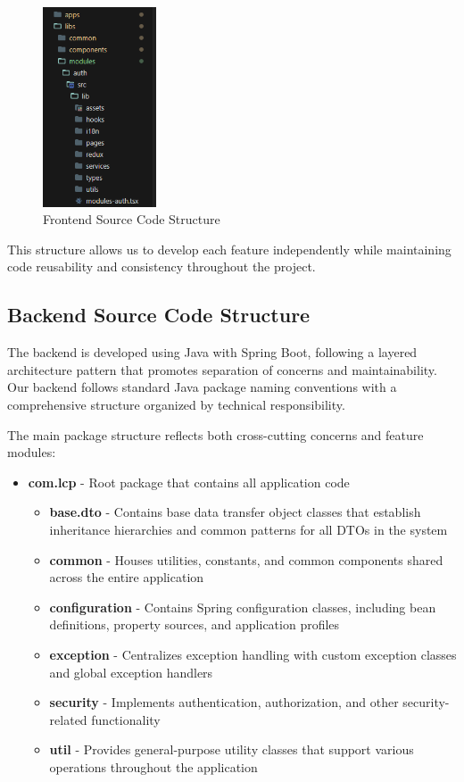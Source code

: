 \begin{figure}[H]
  \centering
  \includegraphics[width=0.3\textwidth]{graphics/sys-design/frontend_folder_structure_1.png}
  \caption{Frontend Source Code Structure}
  \label{fig:frontend_structure}
\end{figure} 


This structure allows us to develop each feature independently while maintaining code reusability and consistency throughout the project.

\subsection{Backend Source Code Structure}
The backend is developed using Java with Spring Boot, following a layered architecture pattern that promotes separation of concerns and maintainability. Our backend follows standard Java package naming conventions with a comprehensive structure organized by technical responsibility.

The main package structure reflects both cross-cutting concerns and feature modules:

\begin{itemize}
    \item \textbf{com.lcp} - Root package that contains all application code
    \begin{itemize}
        \item \textbf{base.dto} - Contains base data transfer object classes that establish inheritance hierarchies and common patterns for all DTOs in the system
        \item \textbf{common} - Houses utilities, constants, and common components shared across the entire application
        \item \textbf{configuration} - Contains Spring configuration classes, including bean definitions, property sources, and application profiles
        \item \textbf{exception} - Centralizes exception handling with custom exception classes and global exception handlers
        \item \textbf{security} - Implements authentication, authorization, and other security-related functionality
        \item \textbf{util} - Provides general-purpose utility classes that support various operations throughout the application
    \end{itemize}
\end{itemize}

